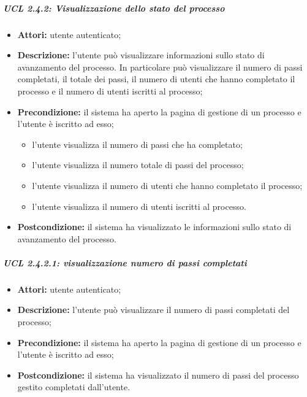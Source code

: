 \subparagraph{UCL 2.4.2: Visualizzazione dello stato del processo}
\begin{itemize}
\item \textbf{Attori:} utente autenticato;
\item \textbf{Descrizione:} l'utente può visualizzare informazioni sullo stato di avanzamento del processo. In particolare può visualizzare il numero di passi completati, il totale dei passi, il numero di utenti che hanno completato il processo e il numero di utenti iscritti al processo;
\item \textbf{Precondizione:} il sistema ha aperto la pagina di gestione di un processo e l'utente è iscritto ad esso;
\begin{itemize}
\item l'utente visualizza il numero di passi che ha completato;
\item l'utente visualizza il numero totale di passi del processo;
\item l'utente visualizza il numero di utenti che hanno completato il processo;
\item l'utente visualizza il numero di utenti iscritti al processo.
\end{itemize}
\item \textbf{Postcondizione:} il sistema ha visualizzato le informazioni sullo stato di avanzamento del processo.
\end{itemize}

\subparagraph{UCL 2.4.2.1: visualizzazione numero di passi completati}
\begin{itemize}
\item \textbf{Attori:} utente autenticato;
\item \textbf{Descrizione:} l'utente può visualizzare il numero di passi completati del processo;
\item \textbf{Precondizione:} il sistema ha aperto la pagina di gestione di un processo e l'utente è iscritto ad esso;
\item \textbf{Postcondizione:} il sistema ha visualizzato il numero di passi del processo gestito completati dall'utente.
\end{itemize}

